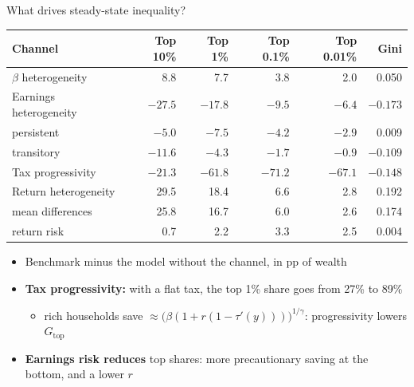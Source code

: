 \documentclass[10pt,english,10pt]{beamer}
\begin{document}
\begin{frame}{What drives steady-state inequality?}
\begin{center}
\footnotesize
\setlength{\tabcolsep}{4pt}
\begin{tabular}{lrrrrr}
\toprule
Channel & Top 10\% & Top 1\% & Top 0.1\% & Top 0.01\% & Gini\\
\midrule
$\beta$ heterogeneity & 8.8 & 7.7 & 3.8 & 2.0 & 0.050\\
Earnings heterogeneity & $-27.5$ & $-17.8$ & $-9.5$ & $-6.4$ & $-0.173$\\
\quad persistent & $-5.0$ & $-7.5$ & $-4.2$ & $-2.9$ & 0.009\\
\quad transitory & $-11.6$ & $-4.3$ & $-1.7$ & $-0.9$ & $-0.109$\\
Tax progressivity & $-21.3$ & $-61.8$ & $-71.2$ & $-67.1$ & $-0.148$\\
Return heterogeneity & 29.5 & 18.4 & 6.6 & 2.8 & 0.192\\
\quad mean differences & 25.8 & 16.7 & 6.0 & 2.6 & 0.174\\
\quad return risk & 0.7 & 2.2 & 3.3 & 2.5 & 0.004\\
\bottomrule
\end{tabular}
\end{center}
{\small
\begin{itemize}
\item Benchmark minus the model without the channel, in pp of wealth
\item \textbf{Tax progressivity:} with a flat tax, the top 1\% share goes from 27\% to 89\%
\begin{itemize}
\item rich households save $\approx\big(\beta(1+r(1-\tau'(y)))\big)^{1/\gamma}$: progressivity lowers $G_{\text{top}}$
\end{itemize}
\item \textbf{Earnings risk reduces} top shares: more precautionary saving at the bottom, and a lower $r$
\end{itemize}}
\end{frame}
\end{document}
